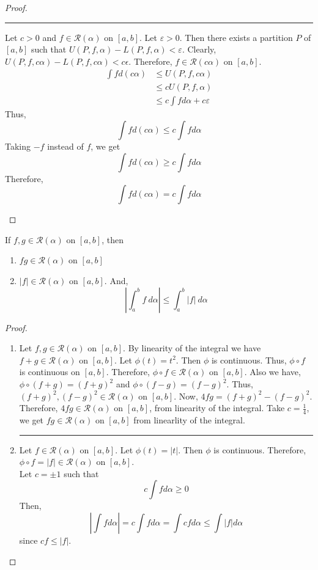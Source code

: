 \begin{proof}
\begin{enumerate}
	\hrule \vspace{1em}

	Let $c>0$ and $f \in \mathscr{R}(\alpha)$ on $[a,b]$.
	Let $\varepsilon > 0$.
	Then there exists a partition $P$ of $[a,b]$ such that $U(P,f,\alpha) - L(P,f,\alpha) < \varepsilon$.
	Clearly, $U(P,f,c\alpha) - L(P,f,c\alpha) < c\epsilon$.
	Therefore, $f \in \mathscr{R}(c\alpha)$ on $[a,b]$.
	\begin{align*}
	\int f d(c\alpha) 
		& \le U(P,f,c\alpha) \\
		& \le cU(P,f,\alpha) \\
		& \le c\int f d\alpha + c\varepsilon
	\end{align*}
	Thus,
	\[ \int f d(c\alpha) \le c \int f d\alpha \]
	Taking $-f$ instead of $f$, we get
	\[ \int f d(c\alpha) \ge c \int f d\alpha \]
	Therefore,
	\[ \int f d(c\alpha) = c \int f d\alpha \]
\end{enumerate}
\end{proof}

\begin{theorem}
If $f,g \in \mathscr{R}(\alpha)$ on $[a,b]$, then
\begin{enumerate}
	\item $fg \in \mathscr{R}(\alpha)$ on $[a,b]$
	\item $|f| \in \mathscr{R}(\alpha)$ on $[a,b]$.
	And,
	\[ \left| \int_a^b f\ d\alpha \right| \le \int_a^b |f|\ d\alpha \]
\end{enumerate}
\end{theorem}
\begin{proof}
\begin{enumerate}
	\item
	Let $f,g \in \mathscr{R}(\alpha)$ on $[a,b]$.
	By linearity of the integral we have $f+g \in \mathscr{R}(\alpha)$ on $[a,b]$.
	Let $\phi(t) = t^2$.
	Then $\phi$ is continuous.
	Thus, $\phi \circ f$ is continuous on $[a,b]$.
	Therefore, $\phi \circ f \in \mathscr{R}(\alpha)$ on $[a,b]$.
	{\color{blue}Also we have, $\phi \circ (f+g) = (f+g)^2$ and $\phi \circ (f-g) = (f-g)^2$.
	Thus, $(f+g)^2,(f-g)^2 \in \mathscr{R}(\alpha)$ on $[a,b]$.
	Now, $4fg = (f+g)^2 - (f-g)^2$.}
	Therefore, $4fg \in \mathscr{R}(\alpha)$ on $[a,b]$, from linearity of the integral.
	Take $c = \frac{1}{4}$, we get $fg \in \mathscr{R}(\alpha)$ on $[a,b]$ from linearlity of the integral.\\

	\hrule \vspace{1em}
	\item
	Let $f \in \mathscr{R}(\alpha)$ on $[a,b]$.
	Let $\phi(t) = |t|$.
	Then $\phi$ is continuous.
	Therefore, $\phi \circ f = |f| \in \mathscr{R}(\alpha)$ on $[a,b]$.\\

	{\color{blue}Let $c = \pm 1$ such that
	\[ c\int f d\alpha \ge 0 \]
	Then, 
	\[ \left|\int f d\alpha \right| = c\int f d\alpha = \int cf d\alpha \le \int |f| d\alpha \]
	since $cf \le |f|$. }
\end{enumerate}
\end{proof}

